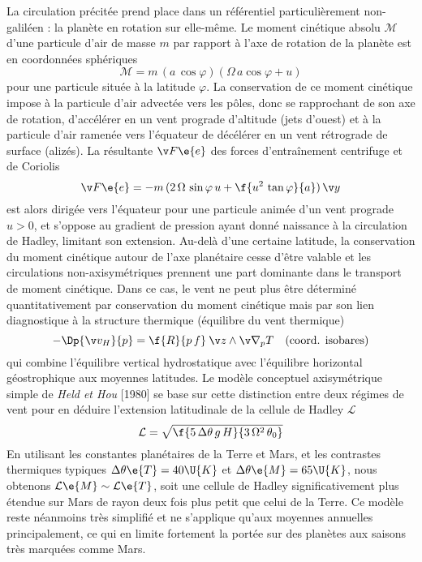 \sk
La circulation précitée prend place
dans un référentiel particulièrement non-galiléen :
la planète en rotation sur elle-même.
%
Le moment cinétique absolu $\mathcal{M}$ 
d'une particule d'air de masse $m$
par rapport à l'axe de rotation de la planète
est en coordonnées sphériques
%
\[
\mathcal{M} = m \, (a \, \cos \varphi) (\Omega \, a \cos \varphi + u)
\]
%
\noindent pour une particule située à la latitude $\varphi$. 
%
\noindent La conservation de ce moment cinétique
impose à la particule d'air advectée vers
les pôles, donc se rapprochant de son axe de rotation,
d'accélérer en un vent prograde d'altitude (jets d'ouest)
et à la particule d'air ramenée vers l'équateur de
décélérer en un vent rétrograde de surface (alizés).
%
La résultante $\vec{F\e{e}}$ des forces 
d'entraînement centrifuge et de Coriolis
%
\[
\vec{F\e{e}} = - m \, (2\,\Omega\,\sin\varphi\,u + \f{u^2\,\tan\varphi}{a}) \, \vec{y}
\]
%
\noindent est alors dirigée vers l'équateur
pour une particule animée d'un vent prograde
$u > 0$,
et s'oppose au gradient de pression ayant donné
naissance à la circulation de Hadley, limitant son extension.
%
Au-delà d'une certaine latitude, la conservation du moment cinétique
autour de l'axe planétaire cesse d'être valable
et les circulations non-axisymétriques
prennent une part dominante dans le transport de moment cinétique.
%
%
Dans ce cas, le vent ne peut plus être déterminé
quantitativement par conservation du moment cinétique mais
par son lien diagnostique à la structure thermique
(équilibre du vent thermique)
%
\[
- \Dp{\vec{v_H}}{p} = \f{R}{p \, f} \: \vec{z} \wedge \vec{\nabla_p} T
\quad
\textrm{(coord. isobares)}
\]
%
\noindent qui combine l'équilibre vertical hydrostatique  
avec l'équilibre horizontal géostrophique aux moyennes latitudes.
%
Le modèle conceptuel axisymétrique simple de \textit{Held et Hou} [1980]\nocite{Held:80}
se base sur cette distinction entre deux régimes de vent pour en déduire
l'extension latitudinale de la cellule de Hadley $\mathcal{L}$
%
%
\[
\mathcal{L} = \sqrt{ \f{ 5 \, \Delta \theta \, g \, H }{ 3 \, \Omega^2 \, \theta_0 } }
\]
%
\noindent En utilisant les constantes planétaires de la Terre et Mars,
et les contrastes thermiques typiques
$\Delta \theta\e{T} = 40\U{K}$
et $\Delta \theta\e{M} = 65\U{K}$,
nous obtenons 
$\mathcal{L}\e{M} \sim \mathcal{L}\e{T}$,
soit une cellule de Hadley
significativement plus étendue sur Mars
de rayon deux fois plus petit que celui
de la Terre.
%
Ce modèle reste néanmoins très simplifié et ne s'applique qu'aux 
moyennes annuelles principalement, ce qui en limite fortement
la portée sur des planètes aux saisons très marquées comme Mars.



